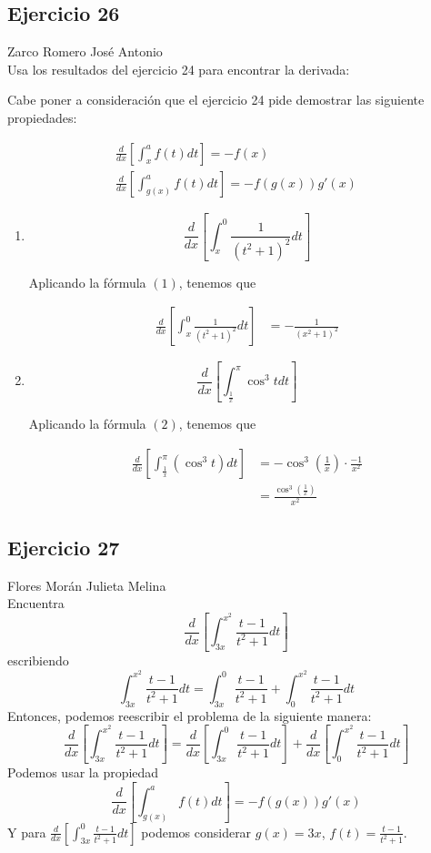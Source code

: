 \documentclass[12pt]{article}
\begin{document}
\begin{enumerate}[label=(\alph*)]
\subsection{Ejercicio 26} Zarco Romero José Antonio  \\

  Usa los resultados del ejercicio 24 para encontrar la derivada:
  
  Cabe poner a consideración que el ejercicio 24 pide demostrar las siguiente propiedades:
  
  \begin{align}
    \frac{d}{dx} \left[ \int_x^{a} f(t) dt \right] = -f(x) \\
    \frac{d}{dx} \left[ \int_{g(x)}^{a} f(t) dt \right] = -f(g(x))g'(x)
  \end{align}

  \begin{enumerate}[label=\alph*), format=\textbf]
    
  \item $$\frac{d}{dx} \left[ \int_x^0 \frac{1}{(t^2+1)^2} dt \right]$$

    Aplicando la fórmula $(1)$, tenemos que
    
    \begin{align*}
      \frac{d}{dx} \left[ \int_x^0 \frac{1}{(t^2+1)^2} dt \right]
      &= -\frac{1}{(x^2+1)^2}
    \end{align*}
    
  \item $$\frac{d}{dx} \left[ \int_{\frac{1}{x}}^{\pi} \cos^3{t} dt \right]$$

    Aplicando la fórmula $(2)$, tenemos que
    
    \begin{align*}
      \frac{d}{dx} \left[ \int_{\frac{1}{x}}^{\pi} (\cos^3{t}) dt \right]
      &= -\cos^3{(\frac{1}{x})}\cdot\frac{-1}{x^2} \\
      &= \frac{\cos^3{(\frac{1}{x})}}{x^2}
    \end{align*}
    
  \end{enumerate}
\subsection{Ejercicio 27} Flores Morán Julieta Melina \\
Encuentra
\[
\frac{d}{dx} \left[ \int_{3x}^{x^2} \frac{t-1}{t^2+1} dt \right]
\]
escribiendo
\[
\int_{3x}^{x^2} \frac{t-1}{t^2+1} dt = \int_{3x}^{0} \frac{t-1}{t^2+1} + \int_{0}^{x^2} \frac{t-1}{t^2+1} dt
\]
Entonces, podemos reescribir el problema de la siguiente manera:
\[
\frac{d}{dx} \left[ \int_{3x}^{x^2} \frac{t-1}{t^2+1} dt \right] = \frac{d}{dx} \left[\int_{3x}^{0} \frac{t-1}{t^2+1} dt\right]  + \frac{d}{dx} \left[ \int_{0}^{x^2} \frac{t-1}{t^2+1} dt \right]
\]
Podemos usar la propiedad
 \[
\frac{d}{dx} \left[ \int_{g(x)}^{a} f(t) dt \right] = -f(g(x))g'(x)
\]
Y para $\frac{d}{dx} \left[\int_{3x}^{0} \frac{t-1}{t^2+1} dt\right]$ podemos considerar $g(x) = 3x$, $f(t) = \frac{t-1}{t^2+1}$.


\end{enumerate}
\end{document}
